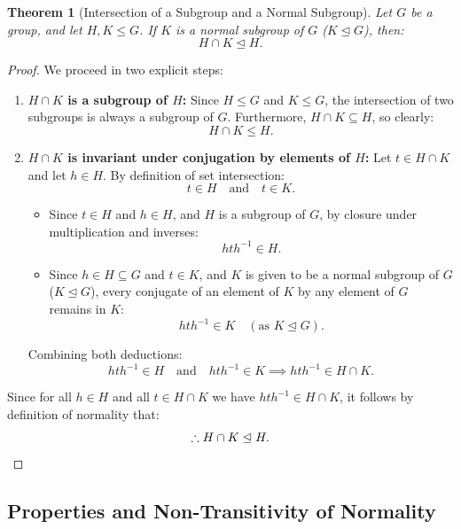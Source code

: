 \documentclass[12pt]{article}
\theoremstyle{definition}
\theoremstyle{plain}
\newtheorem{theorem}{Theorem}[section]
\begin{document}
\begin{theorem}[Intersection of a Subgroup and a Normal Subgroup]
Let $G$ be a group, and let $H, K \le G$. If $K$ is a normal subgroup of $G$ ($K \trianglelefteq G$), then:
\[
H \cap K \trianglelefteq H.
\]
\end{theorem}

\begin{proof}
We proceed in two explicit steps:
\begin{enumerate}
    \item \textbf{$H \cap K$ is a subgroup of $H$:}
    Since $H \le G$ and $K \le G$, the intersection of two subgroups is always a subgroup of $G$. Furthermore, $H \cap K \subseteq H$, so clearly:
    \[
    H \cap K \le H.
    \]
    
    \item \textbf{$H \cap K$ is invariant under conjugation by elements of $H$:}
    Let $t \in H \cap K$ and let $h \in H$.
    By definition of set intersection:
    \[
    t \in H \quad \text{and} \quad t \in K.
    \]
    \begin{itemize}
        \item Since $t \in H$ and $h \in H$, and $H$ is a subgroup of $G$, by closure under multiplication and inverses:
        \[
        h t h^{-1} \in H.
        \]
        \item Since $h \in H \subseteq G$ and $t \in K$, and $K$ is given to be a normal subgroup of $G$ ($K \trianglelefteq G$), every conjugate of an element of $K$ by any element of $G$ remains in $K$:
        \[
        h t h^{-1} \in K \quad (\text{as } K \trianglelefteq G).
        \]
    \end{itemize}
    Combining both deductions:
    \[
    h t h^{-1} \in H \quad \text{and} \quad h t h^{-1} \in K \implies h t h^{-1} \in H \cap K.
    \]
\end{enumerate}
Since for all $h \in H$ and all $t \in H \cap K$ we have $h t h^{-1} \in H \cap K$, it follows by definition of normality that:
\[
\therefore H \cap K \trianglelefteq H. \qedhere
\]
\end{proof}

\subsection{Properties and Non-Transitivity of Normality}
\end{document}

